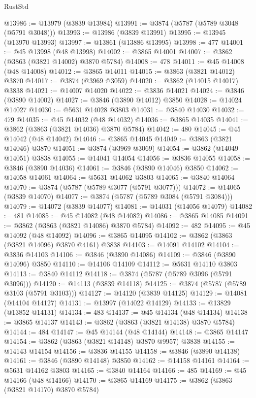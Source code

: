 \begin{lexlean}{RustStd}
\begin{coremodule}
@13986 := @13979 (@3839 @13984)
@13991 := @3874 (@5787 (@5789 @3048 (@5791 @3048)))
@13993 := @13986 (@3839 @13991)
@13995 := @13945 (@13970 @13993)
@13997 := @13861 (@13886 @13995)
@13998 := 477
@14001 := @45 @13998 (@48 @13998)
@14002 := @3865 @14001
@14007 := @3862 (@3863 (@3821 @14002) @3870 @5784)
@14008 := 478
@14011 := @45 @14008 (@48 @14008)
@14012 := @3865 @14011
@14015 := @3863 (@3821 @14012) @3870
@14017 := @3874 (@3969 @3059)
@14020 := @3862 (@14015 @14017) @3838
@14021 := @14007 @14020
@14022 := @3836 @14021
@14024 := @3846 (@3890 @14002)
@14027 := @3846 (@3890 @14012) @3850
@14028 := @14024 @14027
@14030 := @5631 @14028 @3803
@14031 := @3840 @14030
@14032 := 479
@14035 := @45 @14032 (@48 @14032)
@14036 := @3865 @14035
@14041 := @3862 (@3863 (@3821 @14036) @3870 @5784)
@14042 := 480
@14045 := @45 @14042 (@48 @14042)
@14046 := @3865 @14045
@14049 := @3863 (@3821 @14046) @3870
@14051 := @3874 (@3969 @3069)
@14054 := @3862 (@14049 @14051) @3838
@14055 := @14041 @14054
@14056 := @3836 @14055
@14058 := @3846 (@3890 @14036)
@14061 := @3846 (@3890 @14046) @3850
@14062 := @14058 @14061
@14064 := @5631 @14062 @3803
@14065 := @3840 @14064
@14070 := @3874 (@5787 (@5789 @3077 (@5791 @3077)))
@14072 := @14065 (@3839 @14070)
@14077 := @3874 (@5787 (@5789 @3084 (@5791 @3084)))
@14079 := @14072 (@3839 @14077)
@14081 := @14031 (@14056 @14079)
@14082 := 481
@14085 := @45 @14082 (@48 @14082)
@14086 := @3865 @14085
@14091 := @3862 (@3863 (@3821 @14086) @3870 @5784)
@14092 := 482
@14095 := @45 @14092 (@48 @14092)
@14096 := @3865 @14095
@14102 := @3862 (@3863 (@3821 @14096) @3870 @4161) @3838
@14103 := @14091 @14102
@14104 := @3836 @14103
@14106 := @3846 (@3890 @14086)
@14109 := @3846 (@3890 @14096) @3850
@14110 := @14106 @14109
@14112 := @5631 @14110 @3803
@14113 := @3840 @14112
@14118 := @3874 (@5787 (@5789 @3096 (@5791 @3096)))
@14120 := @14113 (@3839 @14118)
@14125 := @3874 (@5787 (@5789 @3103 (@5791 @3103)))
@14127 := @14120 (@3839 @14125)
@14129 := @14081 (@14104 @14127)
@14131 := @13997 (@14022 @14129)
@14133 := @13829 (@13852 @14131)
@14134 := 483
@14137 := @45 @14134 (@48 @14134)
@14138 := @3865 @14137
@14143 := @3862 (@3863 (@3821 @14138) @3870 @5784)
@14144 := 484
@14147 := @45 @14144 (@48 @14144)
@14148 := @3865 @14147
@14154 := @3862 (@3863 (@3821 @14148) @3870 @9957) @3838
@14155 := @14143 @14154
@14156 := @3836 @14155
@14158 := @3846 (@3890 @14138)
@14161 := @3846 (@3890 @14148) @3850
@14162 := @14158 @14161
@14164 := @5631 @14162 @3803
@14165 := @3840 @14164
@14166 := 485
@14169 := @45 @14166 (@48 @14166)
@14170 := @3865 @14169
@14175 := @3862 (@3863 (@3821 @14170) @3870 @5784)

\end{coremodule}
\end{lexlean}
